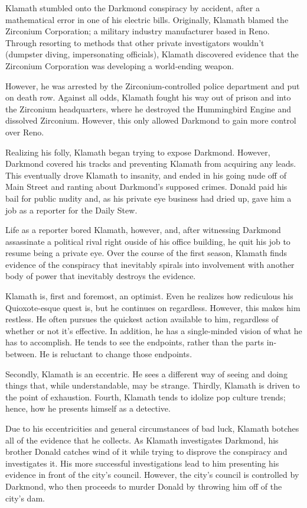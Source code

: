 \documentclass{article}
\begin{document}
Klamath stumbled onto the Darkmond conspiracy by accident, after a mathematical error in one of his electric bills. Originally, Klamath blamed the Zirconium Corporation; a military industry manufacturer based in Reno. Through resorting to methods that other private investigators wouldn't (dumpster diving, impersonating officials), Klamath discovered evidence that the Zirconium Corporation was developing a world-ending weapon.

However, he was arrested by the Zirconium-controlled police department and put on death row. Against all odds, Klamath fought his way out of prison and into the Zirconium headquarters, where he destroyed the Hummingbird Engine and dissolved Zirconium. However, this only allowed Darkmond to gain more control over Reno.

Realizing his folly, Klamath began trying to expose Darkmond. However, Darkmond covered his tracks and preventing Klamath from acquiring any leads. This eventually drove Klamath to insanity, and ended in his going nude off of Main Street and ranting about Darkmond's supposed crimes. Donald paid his bail for public nudity and, as his private eye business had dried up, gave him a job as a reporter for the Daily Stew.

Life as a reporter bored Klamath, however, and, after witnessing Darkmond assassinate a political rival right ouside of his office building, he quit his job to resume being a private eye. Over the course of the first season, Klamath finds evidence of the conspiracy that inevitably spirals into involvement with another body of power that inevitably destroys the evidence.

Klamath is, first and foremost, an optimist. Even he realizes how rediculous his Quioxote-esque quest is, but he continues on regardless. However, this makes him restless. He often pursues the quickest action available to him, regardless of whether or not it's effective. In addition, he has a single-minded vision of what he has to accomplish. He tends to see the endpoints, rather than the parts in-between. He is reluctant to change those endpoints.

Secondly, Klamath is an eccentric. He sees a different way of seeing and doing things that, while understandable, may be strange. Thirdly, Klamath is driven to the point of exhaustion. Fourth, Klamath tends to idolize pop culture trends; hence, how he presents himself as a detective.

Due to his eccentricities and general circumstances of bad luck, Klamath botches all of the evidence that he collects. As Klamath investigates Darkmond, his brother Donald catches wind of it while trying to disprove the conspiracy and investigates it. His more successful investigations lead to him presenting his evidence in front of the city's council. However, the city's council is controlled by Darkmond, who then proceeds to murder Donald by throwing him off of the city's dam.
\end{document}
